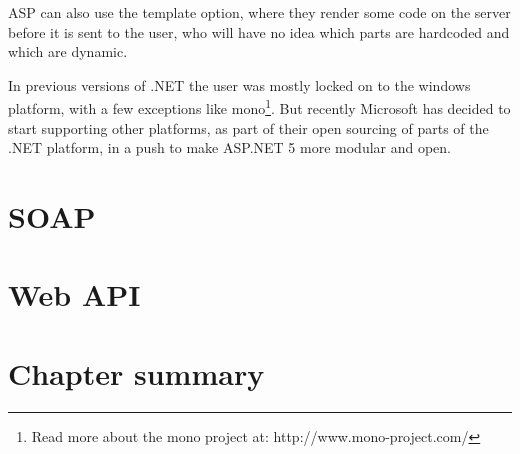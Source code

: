 ASP can also use the template option, where they render some code on the server before it is sent to the user, who will have no idea which parts are hardcoded and which are dynamic.

In previous versions of .NET the user was mostly locked on to the windows platform, with a few exceptions like mono\footnote{Read more about the mono project at: http://www.mono-project.com/}. But recently Microsoft has decided to start supporting other platforms, as part of their open sourcing of parts of the .NET platform\cite{.net-core}, in a push to make ASP.NET 5 more modular and open.

\section{SOAP}
\label{sec:SOAP}

\section{Web API}
\label{sec:Web API}



\section{Chapter summary}
